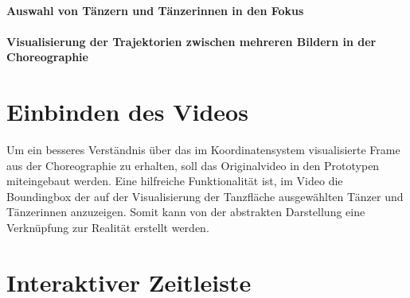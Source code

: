 \documentclass[
  ngerman,
  a4paper,  %
  twoside,  %
  bibliography=totoc,
  headsepline,
  cleardoublepage=empty,
  parskip=half,
  draft=false
]{scrbook}
\begin{document}
\paragraph{Auswahl von Tänzern und Tänzerinnen in den Fokus}
\paragraph{Visualisierung der Trajektorien zwischen mehreren Bildern in der Choreographie}
\section{Einbinden des Videos}
Um ein besseres Verständnis über das im Koordinatensystem visualisierte Frame aus der Choreographie zu erhalten, soll das Originalvideo in den Prototypen miteingebaut werden. Eine hilfreiche Funktionalität ist, im Video die Boundingbox der auf der Visualisierung der Tanzfläche ausgewählten Tänzer und Tänzerinnen anzuzeigen. Somit kann von der abstrakten Darstellung eine Verknüpfung zur Realität erstellt werden.
\section{Interaktiver Zeitleiste}
\end{document}
